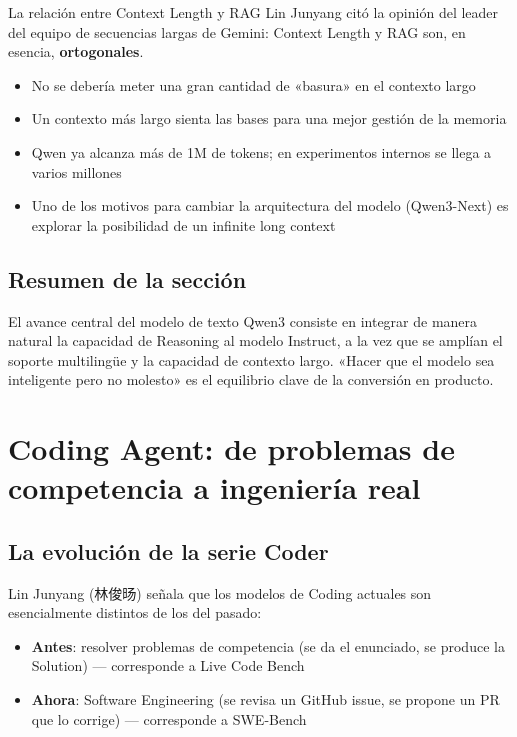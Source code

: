 \documentclass[a4paper]{article}
\begin{document}
\begin{knowledgebox}{La relación entre Context Length y RAG}
Lin Junyang citó la opinión del leader del equipo de secuencias largas de Gemini: Context Length y RAG son, en esencia, \textbf{ortogonales}.
\begin{itemize}
    \item No se debería meter una gran cantidad de «basura» en el contexto largo
    \item Un contexto más largo sienta las bases para una mejor gestión de la memoria
    \item Qwen ya alcanza más de 1M de tokens; en experimentos internos se llega a varios millones
    \item Uno de los motivos para cambiar la arquitectura del modelo (Qwen3-Next) es explorar la posibilidad de un infinite long context
\end{itemize}
\end{knowledgebox}

\subsection{Resumen de la sección}

El avance central del modelo de texto Qwen3 consiste en integrar de manera natural la capacidad de Reasoning al modelo Instruct, a la vez que se amplían el soporte multilingüe y la capacidad de contexto largo. «Hacer que el modelo sea inteligente pero no molesto» es el equilibrio clave de la conversión en producto.

\section{Coding Agent: de problemas de competencia a ingeniería real}

\subsection{La evolución de la serie Coder}

Lin Junyang (林俊旸) señala que los modelos de Coding actuales son esencialmente distintos de los del pasado:

\begin{itemize}
    \item \textbf{Antes}: resolver problemas de competencia (se da el enunciado, se produce la Solution) — corresponde a Live Code Bench
    \item \textbf{Ahora}: Software Engineering (se revisa un GitHub issue, se propone un PR que lo corrige) — corresponde a SWE-Bench
\end{itemize}
\end{document}
